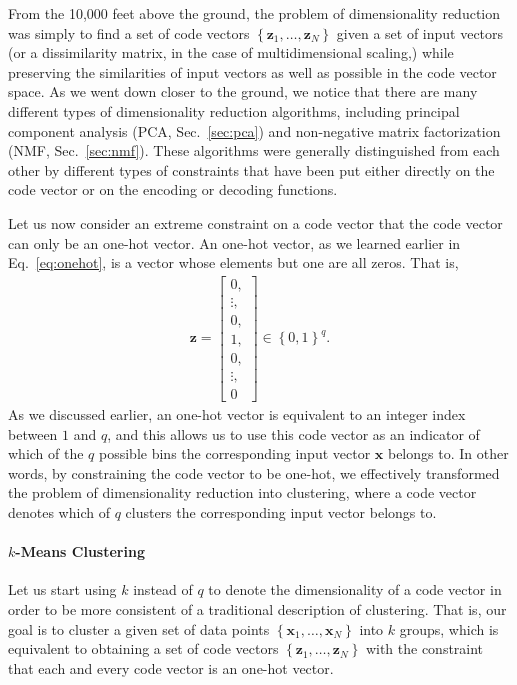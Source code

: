\documentclass{report}
\newcommand{\vect}[1]{\mathbf{#1}}
\newcommand{\vx}[0]{\vect{x}}
\newcommand{\vz}[0]{\vect{z}}
\begin{document}
From the 10,000 feet above the ground, the problem of dimensionality reduction
was simply to find a set of code vectors $\left\{ \vz_1, \ldots, \vz_N \right\}$
given a set of input vectors (or a dissimilarity matrix, in the case of
multidimensional scaling,) while preserving the similarities of input vectors as
well as possible in the code vector space. As we went down closer to the ground,
we notice that there are many different types of dimensionality reduction
algorithms, including principal component analysis (PCA, Sec.~\ref{sec:pca}) and
non-negative matrix factorization (NMF, Sec.~\ref{sec:nmf}). These algorithms
were generally distinguished from each other by different types of constraints
that have been put either directly on the code vector or on the encoding or
decoding functions. 

Let us now consider an extreme constraint on a code vector that the code vector
can only be an one-hot vector. An one-hot vector, as we learned earlier in
Eq.~\eqref{eq:onehot}, is a vector whose elements but one are all zeros. That
is, 
\begin{align}
    \label{eq:onehot}
    \vz = 
    \left[ 
        \begin{array}{c}
            0, \\
            \vdots, \\
            0, \\
            1, \\
            0, \\
            \vdots, \\
            0
        \end{array}
    \right] \in \left\{ 0, 1\right\}^q.
\end{align}
As we discussed earlier, an one-hot vector is equivalent to an integer index
between $1$ and $q$, and this allows us to use this code vector as an indicator
of which of the $q$ possible bins the corresponding input vector $\vx$ belongs
to. In other words, by constraining the code vector to be one-hot, we
effectively transformed the problem of dimensionality reduction into clustering,
where a code vector denotes which of $q$ clusters the corresponding input vector
belongs to.

\paragraph{$k$-Means Clustering}

Let us start using $k$ instead of $q$ to denote the dimensionality of a code
vector in order to be more consistent of a traditional description of
clustering. That is, our goal is to cluster a given set of data points $\left\{
    \vx_1, \ldots, \vx_N
\right\}$ into $k$ groups, which is equivalent to obtaining a set of code
vectors $\left\{ \vz_1, \ldots, \vz_N \right\}$ with the constraint that each
and every code vector is an one-hot vector. 
\end{document}
